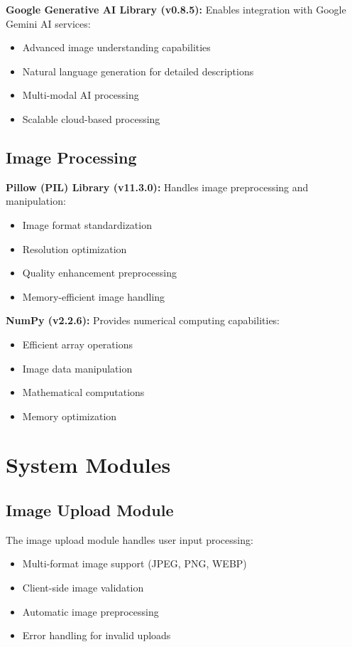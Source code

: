 \documentclass[conference]{IEEEtran}
\begin{document}
\textbf{Google Generative AI Library (v0.8.5):} Enables integration with Google Gemini AI services:
\begin{itemize}
\item Advanced image understanding capabilities
\item Natural language generation for detailed descriptions
\item Multi-modal AI processing
\item Scalable cloud-based processing
\end{itemize}

\subsection{Image Processing}

\textbf{Pillow (PIL) Library (v11.3.0):} Handles image preprocessing and manipulation:
\begin{itemize}
\item Image format standardization
\item Resolution optimization
\item Quality enhancement preprocessing
\item Memory-efficient image handling
\end{itemize}

\textbf{NumPy (v2.2.6):} Provides numerical computing capabilities:
\begin{itemize}
\item Efficient array operations
\item Image data manipulation
\item Mathematical computations
\item Memory optimization
\end{itemize}

\section{System Modules}

\subsection{Image Upload Module}

The image upload module handles user input processing:

\begin{itemize}
\item Multi-format image support (JPEG, PNG, WEBP)
\item Client-side image validation
\item Automatic image preprocessing
\item Error handling for invalid uploads
\end{itemize}
\end{document}
